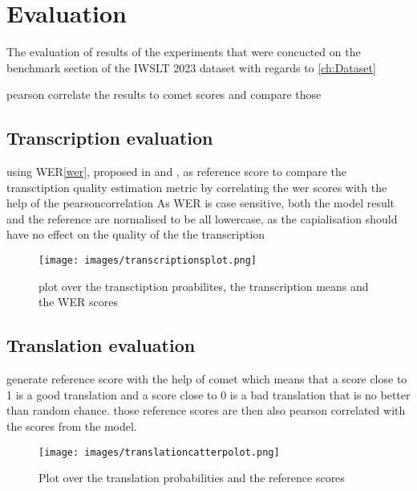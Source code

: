 
\chapter{Evaluation}
\label{ch:Evaluation}
The evaluation of results of the experiments that were concucted on the benchmark section of the IWSLT 2023 dataset \cite{sperber2024evaluating} with regards to \ref{ch:Dataset}

pearson correlate \cite{2020SciPy-NMeth} the results to comet scores and compare those 

\section{Transcription evaluation}

using WER\ref{wer}, proposed in \cite{woodard1982} and \cite{morris2004}, as reference score to compare the transctiption quality estimation metric by correlating the wer scores with the help of the pearsoncorrelation \cite{2020SciPy-NMeth}
As WER is case sensitive, both the model result and the reference are normalised to be all lowercase, as the capialisation should have no effect on the quality of the the transcription
\begin{figure}
    \centering
    \texttt{[image: images/transcriptionsplot.png]}
    \caption{plot over the transctiption proabilites, the transcription means and the WER scores}
    \label{fig:transcript scatter plot}
\end{figure}

\section{Translation evaluation}

generate reference score with the help of comet \cite{rei-etal-2020-comet} which means that a score close to 1 is a good translation and a score close to 0 is a bad translation that is no better than random chance.
those reference scores are then also pearson correlated with the scores from the model. 
\begin{figure}
    \centering
    \texttt{[image: images/translationcatterpolot.png]}
    \caption{Plot over the translation probabilities and the reference scores}
    \label{fig:translationeval scatter plot}
\end{figure}


